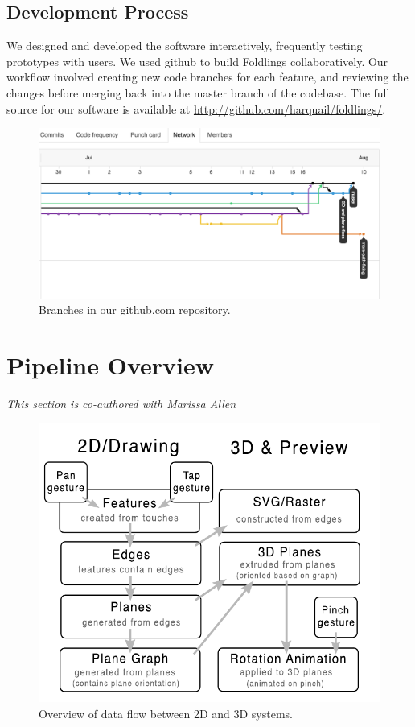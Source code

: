 \subsection{Development Process}\label{development-process}

We designed and developed the software interactively, frequently testing
prototypes with users. We used github to build Foldlings
collaboratively. Our workflow involved creating new code branches for
each feature, and reviewing the changes before merging back into the
master branch of the codebase. The full source for our software is
available at \url{http://github.com/harquail/foldlings/}.

\begin{figure}[htbp]
\centering
\includegraphics{figures/shared/02_Overview/gitflow.png}
\caption{Branches in our github.com repository.}
\end{figure}

\section{Pipeline Overview}\label{pipeline-overview}

\emph{This section is co-authored with Marissa Allen}

\begin{figure}[htbp]
\centering
\includegraphics{figures/shared/02_Overview/pipeline.pdf}
\caption{Overview of data flow between 2D and 3D systems.}
\end{figure}

